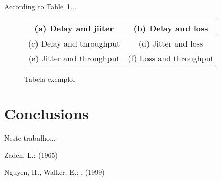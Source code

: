\documentclass{llncs}
\begin{document}
According to Table~\ref{tab:TabelaExemplo}...

\begin{figure}
\centering
\begin{tabular}{|c|c|}\hline
(a) Delay and jiiter & (b) Delay and loss \\ \hline

(c) Delay and throughput & (d) Jitter and loss \\ \hline

(e) Jitter and throughput & (f) Loss and throughput \\ \hline
\end{tabular}
\caption{\label{tab:TabelaExemplo}Tabela exemplo.}
\end{figure}


\section{Conclusions}
Neste trabalho...

%

\begin{thebibliography}{1}
Zadeh, L.:
 (1965)

Nguyen, H., Walker, E.:
.
 (1999)
\end{thebibliography}
\end{document}
